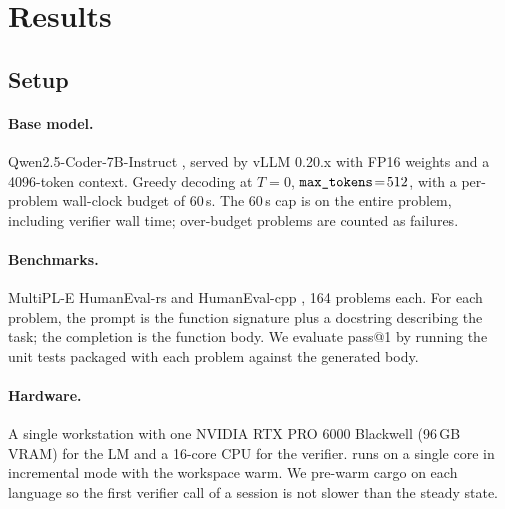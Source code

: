 \section{Results}\label{sec:results}

\subsection{Setup}\label{sec:setup}

\paragraph{Base model.}
Qwen2.5-Coder-7B-Instruct \citep{hui2024qwen25coder}, served by
vLLM 0.20.x with FP16 weights and a 4096-token context. Greedy
decoding at $T\!=\!0$, $\texttt{max\_tokens}\!=\!512$, with a per-problem
wall-clock budget of $60$\,s. The 60\,s cap is on the entire
problem, including verifier wall time; over-budget problems are
counted as failures.

\paragraph{Benchmarks.}
MultiPL-E HumanEval-rs and HumanEval-cpp
\citep{cassano2022multipl,chen2021humaneval}, 164 problems each.
For each problem, the prompt is the function signature plus a
docstring describing the task; the completion is the function body.
We evaluate pass@1 by running the unit tests packaged with each
problem against the generated body.

\paragraph{Hardware.}
A single workstation with one NVIDIA RTX PRO 6000 Blackwell
(96\,GB VRAM) for the LM and a 16-core CPU for the verifier.
 runs on a single core in incremental mode with
the workspace warm. We pre-warm cargo on each language so the first
verifier call of a session is not slower than the steady state.

